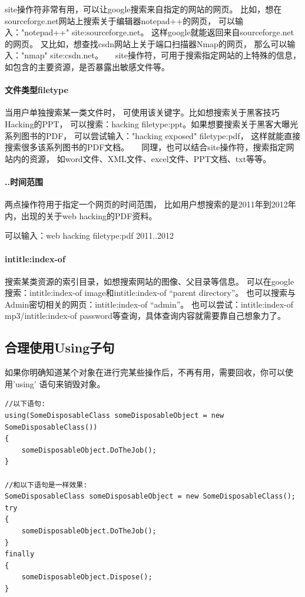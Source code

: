 \documentclass{book}
\begin{document}
site操作符非常有用，可以让google搜索来自指定的网站的网页。
比如，想在sourceforge.net网站上搜索关于编辑器notepad++的网页，
可以输入："notepad++"  site:sourceforge.net。
这样google就能返回来自sourceforge.net的网页。
又比如，想查找csdn网站上关于端口扫描器Nmap的网页，
那么可以输入："nmap"  site:csdn.net。　　site操作符，可用于搜索指定网站的上特殊的信息，
如包含的主要资源，是否暴露出敏感文件等。

\paragraph{文件类型filetype}当用户单独搜索某一类文件时，
可使用该关键字。比如想搜索关于黑客技巧Hacking的PPT，
可以搜索：hacking filetype:ppt。如果想要搜索关于黑客大曝光系列图书的PDF，
可以尝试输入："hacking exposed" filetype:pdf，
这样就能直接搜索很多该系列图书的PDF文档。　　同理，也可以结合site操作符，搜索指定网站内的资源，
如word文件、XML文件、excel文件、PPT文档、txt等等。

\paragraph{..时间范围}
两点操作符用于指定一个网页的时间范围，
比如用户想搜索的是2011年到2012年内，出现的关于web hacking的PDF资料。

可以输入：web hacking filetype:pdf 2011..2012

\paragraph{intitle:index-of}
搜索某类资源的索引目录，如想搜索网站的图像、父目录等信息。
可以在google搜索：intitle:index-of image和intitle:index-of “parent directory”。
也可以搜索与Admin密切相关的网页：intitle:index-of “admin”。 
也可以尝试：intitle:index-of mp3/intitle:index-of password等查询，具体查询内容就需要靠自己想象力了。

\subsection{合理使用Using子句}

如果你明确知道某个对象在进行完某些操作后，不再有用，需要回收，你可以使用'using' 语句来销毁对象。

\begin{lstlisting}[language={[Sharp]C}]
//以下语句:
using(SomeDisposableClass someDisposableObject = new SomeDisposableClass())
{
	someDisposableObject.DoTheJob();
}

//和以下语句是一样效果:
SomeDisposableClass someDisposableObject = new SomeDisposableClass();
try
{
	someDisposableObject.DoTheJob();
}
finally
{
	someDisposableObject.Dispose();
}
\end{lstlisting}
\end{document}
